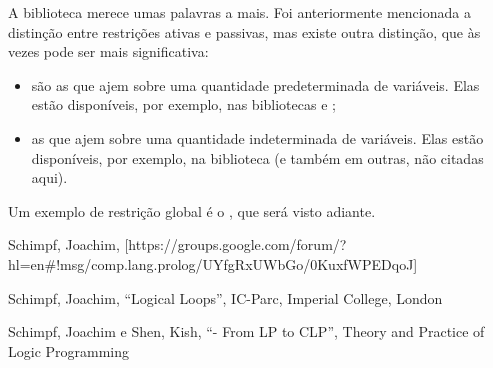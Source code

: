 A biblioteca  merece umas palavras a mais. Foi anteriormente mencionada a
distinção entre restrições ativas e passivas, mas existe outra distinção, que às vezes pode ser mais
significativa:

\begin{itemize}
  \item {} são as que ajem sobre uma quantidade predeterminada de
    variáveis. Elas estão disponíveis, por exemplo, nas bibliotecas  e
    ;
  \item {} as que ajem sobre uma quantidade indeterminada de variáveis. Elas estão disponíveis, por
    exemplo, na biblioteca  (e também em outras, não citadas aqui).
\end{itemize}

Um exemplo de restrição global é o , que será visto adiante.

  \begin{thebibliography}{1}

      Schimpf, Joachim,
      [https://groups.google.com/forum/?hl=en#!msg/comp.lang.prolog/UYfgRxUWbGo/0KuxfWPEDqoJ]

        Schimpf, Joachim,
        ``Logical Loops'', IC-Parc, Imperial College, London

        Schimpf, Joachim e Shen, Kish,
        ``\eclipse - From LP to CLP'',
        Theory and Practice of Logic Programming


  \end{thebibliography}




%
